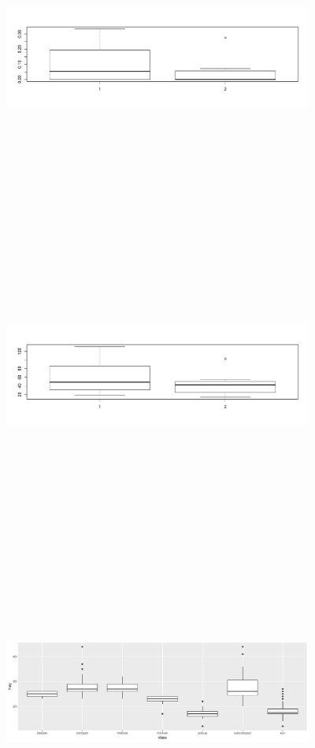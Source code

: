 \documentclass[12pt]{article}\usepackage[]{graphicx}\usepackage[]{color}
\newenvironment{knitrout}{}{} %
\begin{document}
\begin{knitrout}
\color{fgcolor}
\includegraphics[width=4in,height=4in]{RnwFigs/inclusion_criteria-1} 

\includegraphics[width=4in,height=4in]{RnwFigs/inclusion_criteria-2} 

\includegraphics[width=4in,height=4in]{RnwFigs/inclusion_criteria-3} 

\end{knitrout}
\end{document}
